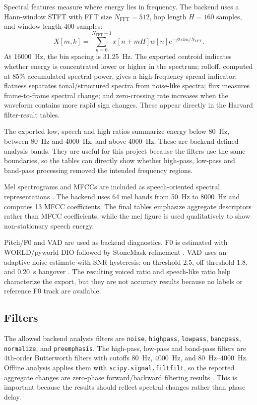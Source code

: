 \documentclass[11pt,a4paper]{article}
\begin{document}
Spectral features measure where energy lies in frequency. The backend uses a Hann-window STFT with FFT size $N_{\mathrm{FFT}}=512$, hop length $H=160$ samples, and window length $400$ samples:
\begin{equation}
    X[m,k] = \sum_{n=0}^{N_{\mathrm{FFT}}-1} x[n+mH]w[n]e^{-j2\pi kn/N_{\mathrm{FFT}}}.
\end{equation}
At \SI{16000}{Hz}, the bin spacing is \SI{31.25}{Hz}. The exported centroid indicates whether energy is concentrated lower or higher in the spectrum; rolloff, computed at 85\% accumulated spectral power, gives a high-frequency spread indicator; flatness separates tonal/structured spectra from noise-like spectra; flux measures frame-to-frame spectral change; and zero-crossing rate increases when the waveform contains more rapid sign changes. These appear directly in the Harvard filter-result tables.

The exported low, speech and high ratios summarize energy below \SI{80}{Hz}, between \SI{80}{Hz} and \SI{4000}{Hz}, and above \SI{4000}{Hz}. These are backend-defined analysis bands. They are useful for this project because the filters use the same boundaries, so the tables can directly show whether high-pass, low-pass and band-pass processing removed the intended frequency regions.

Mel spectrograms and MFCCs are included as speech-oriented spectral representations \citep{mcfee2015librosa}. The backend uses 64 mel bands from \SI{50}{Hz} to \SI{8000}{Hz} and computes 13 MFCC coefficients. The final tables emphasize aggregate descriptors rather than MFCC coefficients, while the mel figure is used qualitatively to show non-stationary speech energy.

Pitch/F0 and VAD are used as backend diagnostics. F0 is estimated with WORLD/pyworld DIO followed by StoneMask refinement \citep{morise2016world}. VAD uses an adaptive noise estimate with SNR hysteresis: on threshold 2.5, off threshold 1.8, and \SI{0.20}{s} hangover \citep{ramirez2007voice}. The resulting voiced ratio and speech-like ratio help characterize the export, but they are not accuracy results because no labels or reference F0 track are available.

\subsection{Filters}

The allowed backend analysis filters are \texttt{noise}, \texttt{highpass}, \texttt{lowpass}, \texttt{bandpass}, \texttt{normalize}, and \texttt{preemphasis}. The high-pass, low-pass and band-pass filters are 4th-order Butterworth filters with cutoffs \SI{80}{Hz}, \SI{4000}{Hz}, and \SIrange{80}{4000}{Hz}. Offline analysis applies them with \texttt{scipy.signal.filtfilt}, so the reported aggregate changes are zero-phase forward/backward filtering results \citep{oppenheim1999discrete}. This is important because the results should reflect spectral changes rather than phase delay.
\end{document}

